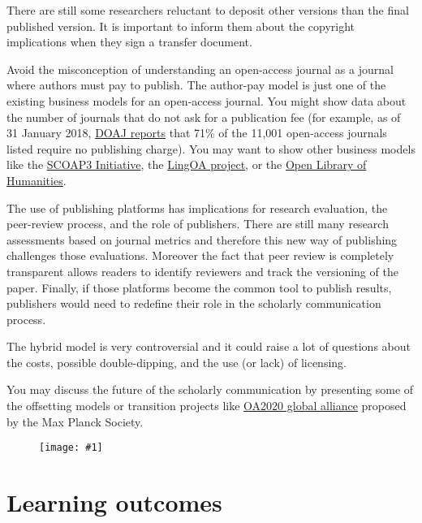 \documentclass{article}
\newlength{\imgwidth}
\newcommand\scaledgraphics[2]{%
                
\settowidth{\imgwidth}{\texttt{[image: \#1]}}%
                
\setlength{\imgwidth}{\minof{\imgwidth}{#2\textwidth}}%
                
\texttt{[image: \#1]}%
                
}
\begin{document}
There are still some researchers reluctant to deposit other versions than the final published version. It is important to inform them about the copyright implications when they sign a transfer document.


Avoid the misconception of understanding an open-access journal as a journal where authors must pay to publish. The author-pay model is just one of the existing business models for an open-access journal. You might show data about the number of journals that do not ask for a publication fee (for example, as of 31 January 2018, \href{https://sustainingknowledgecommons.org/2018/02/06/doaj-apc-information-as-of-jan-31-2018/}{DOAJ reports} that 71\% of the 11,001 open-access journals listed require no publishing charge). You may want to show other business models like the \href{https://scoap3.org/}{SCOAP3 Initiative}, the \href{http://www.lingoa.eu/}{LingOA project}, or the \href{https://www.openlibhums.org/}{Open Library of Humanities}.


The use of publishing platforms has implications for research evaluation, the peer-review process, and the role of publishers. There are still many research assessments based on journal metrics and therefore this new way of publishing challenges those evaluations. Moreover the fact that peer review is completely transparent allows readers to identify reviewers and track the versioning of the paper. Finally, if those platforms become the common tool to publish results, publishers would need to redefine their role in the scholarly communication process.


The hybrid model is very controversial and it could raise a lot of questions about the costs, possible double-dipping, and the use (or lack) of licensing.


You may discuss the future of the scholarly communication by presenting some of the offsetting models or transition projects like \href{https://oa2020.org/}{OA2020 global alliance} proposed by the Max Planck Society.

\begin{figure}
\scaledgraphics{78242a58-956c-4a6f-8d50-a93e47eb21b4.png}{1}
\label{F14847591}
\end{figure}


\section{Learning outcomes}\label{learning-outcomes}
\end{document}
